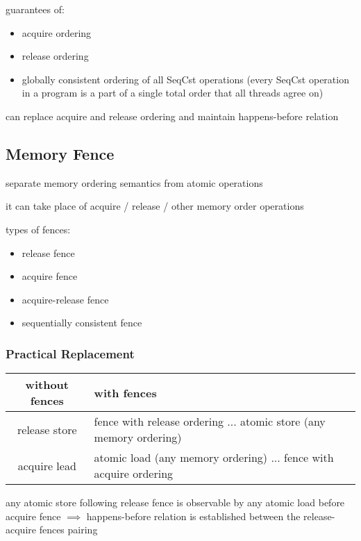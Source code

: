\documentclass[8pt]{extarticle}
\begin{document}
\begin{multicols*}{2}
    guarantees of:
    \begin{itemize}
    \item acquire ordering
    \item release ordering
    \item globally consistent ordering of all SeqCst operations (every SeqCst operation in a program is a part of a single total order that all threads agree on)
    \end{itemize}

    can replace acquire and release ordering and maintain happens-before relation
    
    \subsection{Memory Fence}

    separate memory ordering semantics from atomic operations

    it can take place of acquire / release / other memory order operations

    types of fences:
    \begin{itemize}
    \item release fence
    \item acquire fence
    \item acquire-release fence
    \item sequentially consistent fence
    \end{itemize}
      
    \subsubsection{Practical Replacement}
    
    \begin{tabular}{| c | p{50mm} |}
    \hline
    \textbf{without fences} & \textbf{with fences} \\
    \hline
    release store & fence with release ordering \newline ... \newline atomic store (any memory ordering) \\
    \hline
    acquire lead & atomic load (any memory ordering) \newline ... \newline fence with acquire ordering \\
    \hline
    \end{tabular}

    any atomic store following release fence is observable by any atomic load before acquire fence $\implies$ happens-before relation is established between the release-acquire fences pairing


\end{multicols*}
\end{document}
